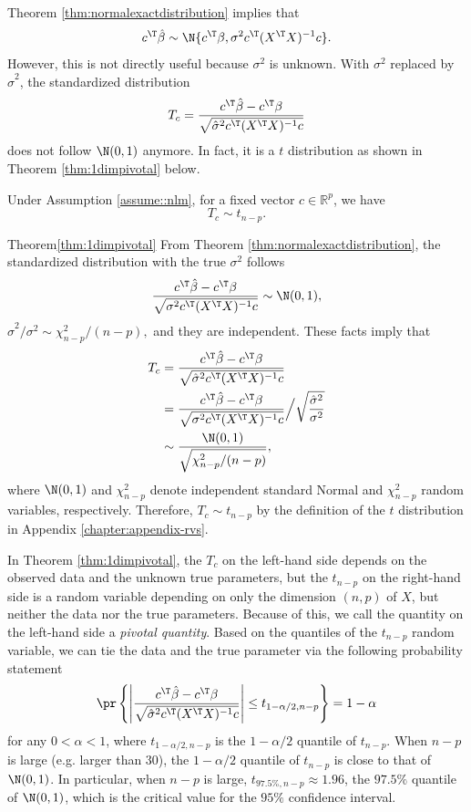 Theorem \ref{thm:normalexactdistribution} implies that 
\[
c ^{\T}\hat{\beta}\sim\N\{ c ^{\T}\beta,\sigma^{2}c ^{\T}(X^{\T}X)^{-1}c \} .
\]
However, this is not directly useful because $\sigma^{2}$ is unknown.
With $\sigma^{2}$ replaced by $\hat{\sigma}^{2}$, the standardized
distribution
\[
T_c  = 
\frac{c ^{\T}\hat{\beta}-c ^{\T}\beta}{\sqrt{\hat{\sigma}^{2}c ^{\T}(X^{\T}X)^{-1}c }}
\]
does not follow $\N(0,1)$ anymore. In fact, it is a $t$ distribution as shown in Theorem \ref{thm:1dimpivotal} below. 

\begin{theorem}
\label{thm:1dimpivotal}Under Assumption \ref{assume::nlm}, for a fixed vector $c  \in \mathbb{R}^p$, we have 
$$
T_c  \sim t_{n-p}.
$$
\end{theorem}




\begin{myproof}{Theorem}{\ref{thm:1dimpivotal}}
From Theorem \ref{thm:normalexactdistribution}, the standardized
distribution with the true $\sigma^{2}$ follows
\[
\frac{c ^{\T}\hat{\beta}-c ^{\T}\beta}{\sqrt{\sigma^{2}c ^{\T}(X^{\T}X)^{-1}c }}\sim\N(0,1),
\]
 $\hat{\sigma}^{2}/\sigma^{2}\sim\chi_{n-p}^{2}/(n-p),$ and they
are independent. These facts imply that
\begin{align*}
T_c &= 
\frac{c ^{\T}\hat{\beta}-c ^{\T}\beta}{\sqrt{\hat{\sigma}^{2}c ^{\T}(X^{\T}X)^{-1}c }} \\
& =\frac{c ^{\T}\hat{\beta}-c ^{\T}\beta}{\sqrt{\sigma^{2}c ^{\T}(X^{\T}X)^{-1}c }}\Big/\sqrt{\frac{\hat{\sigma}^{2}}{\sigma^{2}}}\\
 & \sim \frac{\N(0,1)}{\sqrt{\chi_{n-p}^{2}/(n-p)}} ,
\end{align*}
where $\N(0,1)$ and $\chi_{n-p}^{2}$ denote independent standard Normal and $\chi_{n-p}^{2}$ random variables, respectively. Therefore, 
$T_c \sim t_{n-p}$ by the definition of the $t$ distribution in Appendix \ref{chapter:appendix-rvs}. 
\end{myproof}





In Theorem \ref{thm:1dimpivotal}, the $T_c $ on the left-hand side
depends on the observed data and the unknown true parameters, but the $t_{n-p}$ on the right-hand side is a random variable depending on only the dimension
$(n,p)$ of $X$, but neither the data nor the true parameters. Because of this, we call the quantity on the left-hand side a {\it pivotal quantity}. Based
on the quantiles of the $t_{n-p}$ random variable, we can tie the
data and the true parameter via the following probability statement
\[
\pr\left\{ \left|\frac{c ^{\T}\hat{\beta}-c ^{\T}\beta}{\sqrt{\hat{\sigma}^{2}c ^{\T}(X^{\T}X)^{-1}c }}\right|\leq  
t_{1-\alpha/2,n-p}
\right\} =1-\alpha
\]
 for any $0<\alpha<1$, where $t_{1-\alpha/2,n-p}  $ is the $1-\alpha/2$
quantile of $t_{n-p}$. 
When $n-p$ is large (e.g. larger than $30$), the $1-\alpha/2$ quantile of $t_{n-p}$ is close to that of $\N(0,1)$. 
In particular, when $n-p$ is large, $t_{97.5\%,n-p}\approx 1.96$, the $97.5\%$ quantile of $\N(0,1)$, which is the critical value for the $95\%$ confidence interval. 


